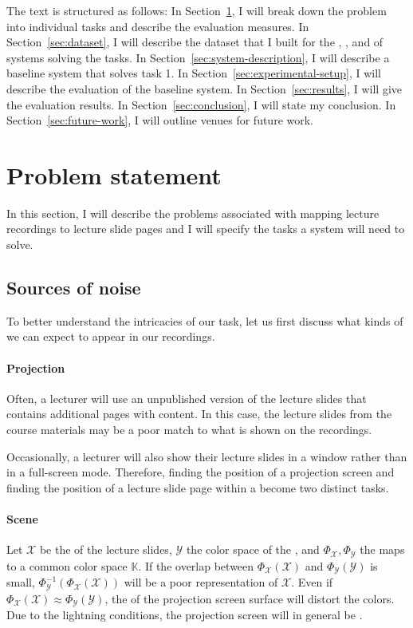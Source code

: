 The text is structured as follows: In Section~\ref{sec:problem}, I will
break down the problem into individual tasks and describe the evaluation
measures. In Section~\ref{sec:dataset}, I will describe the dataset
that I built for the , , and
 of systems solving the tasks. In
Section~\ref{sec:system-description}, I will describe a baseline system that
solves task 1. In Section~\ref{sec:experimental-setup}, I will describe
the evaluation of the baseline system. In Section~\ref{sec:results},
I will give the evaluation results. In Section~\ref{sec:conclusion}, I will
state my conclusion. In Section~\ref{sec:future-work}, I will outline venues
for future work.

\section{Problem statement}
\label{sec:problem}
In this section, I will describe the problems associated with mapping lecture
recordings to lecture slide pages and I will specify the tasks a system will
need to solve.

\subsection{Sources of noise}
\label{sec:noise}
To better understand the intricacies of our task, let us first discuss what
kinds of  we can expect to appear in our recordings.

\paragraph{Projection} Often, a lecturer will use an unpublished version of the
lecture slides that contains additional pages with 
content. In this case, the lecture slides from the course materials may be a
poor match to what is shown on the recordings.

Occasionally, a lecturer will also show their lecture slides in a window rather
than in a full-screen mode. Therefore, finding the position of a projection
screen and finding the position of a lecture slide page within a
 become two distinct tasks.

\paragraph{Scene} Let $\mathcal X$ be the  of the lecture
slides, $\mathcal Y$ the color space of the , and
$\Phi_{\mathcal X},\Phi_{\mathcal Y}$ the maps to a common color space
$\mathbb K$. If the overlap between $\Phi_{\mathcal X}(\mathcal X)$ and
$\Phi_{\mathcal Y}(\mathcal Y)$ is small, $\Phi^{-1}_{\mathcal
Y}(\Phi_{\mathcal X}(\mathcal X))$ will be a poor representation of $\mathcal
X$. Even if $\Phi_{\mathcal X}(\mathcal X)\approx\Phi_{\mathcal Y}(\mathcal
Y)$, the  of the projection screen surface will distort the
colors.
Due to the lightning conditions, the projection screen will in general be
.

